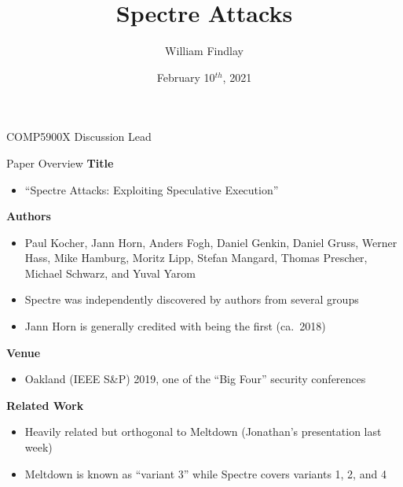 \documentclass[10pt, dvipsnames, aspectratio=169]{beamer}
\date{February 10$^{th}$, 2021}
\title{Spectre Attacks}
\author{William Findlay}
\institute{Carleton University\\\href{mailto:will@ccsl.carleton.ca}{\ttfamily will@ccsl.carleton.ca}}
\begin{document}

\begin{frame}
  \titlepage
  \vfill
  \vspace{4em}
  {\footnotesize COMP5900X Discussion Lead}
\end{frame}

%

\begin{frame}[c]{Paper Overview}{}
  {\bf Title}
  \begin{itemize}
    \item \enquote{Spectre Attacks: Exploiting Speculative Execution}
  \end{itemize}

  \vfill
  {\bf Authors}
  \begin{itemize}
    \item Paul Kocher, Jann Horn, Anders Fogh, Daniel Genkin, Daniel Gruss, Werner Hass, Mike Hamburg, Moritz Lipp, Stefan Mangard, Thomas Prescher, Michael Schwarz, and Yuval Yarom
    \item Spectre was independently discovered by authors from several groups
    \item Jann Horn is generally credited with being the first (ca.~2018)
  \end{itemize}

  \vfill
  {\bf Venue}
  \begin{itemize}
    \item Oakland (IEEE S\&P) 2019, one of the \enquote{Big Four} security conferences
  \end{itemize}

  \vfill
  {\bf Related Work}
  \begin{itemize}
    \item Heavily related but orthogonal to Meltdown (Jonathan's presentation last week)
    \item Meltdown is known as \enquote{variant 3} while Spectre covers variants 1, 2, and 4
  \end{itemize}
\end{frame}
\end{document}

